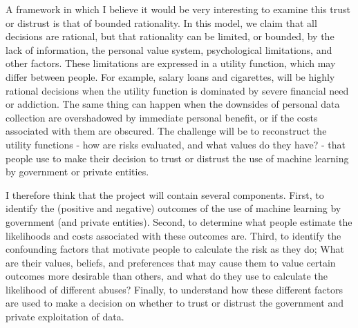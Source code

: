 \documentclass[letterpaper, 10pt]{article} %
\begin{document}
\begin{tcolorbox}[
	blanker,
	width=0.90\textwidth,
	enlarge left by=0.05\textwidth,
	enlarge right by=0.05\textwidth,
	before skip=6pt,
	breakable]
A framework in which I believe it would be very interesting to examine this trust or distrust is that of bounded rationality.
In this model, we claim that all decisions are rational, but that rationality can be limited, or bounded, by the lack of information, the personal value system, psychological limitations, and other factors.
These limitations are expressed in a utility function, which may differ between people.
For example, salary loans and cigarettes, will be highly rational decisions when the utility function is dominated by severe financial need or addiction.
The same thing can happen when the downsides of personal data collection are overshadowed by immediate personal benefit, or if the costs associated with them are obscured.
The challenge will be to reconstruct the utility functions - how are risks evaluated, and what values do they have? - that people use to make their decision to trust or distrust the use of machine learning by government or private entities.


I therefore think that the project will contain several components.
First, to identify the (positive and negative) outcomes of the use of machine learning by government (and private entities).
Second, to determine what people estimate the likelihoods and costs associated with these outcomes are.
Third, to identify the confounding factors that motivate people to calculate the risk as they do; What are their values, beliefs, and preferences that may cause them to value certain outcomes more desirable than others, and what do they use to calculate the likelihood of different abuses?
Finally, to understand how these different factors are used to make a decision on whether to trust or distrust the government and private exploitation of data.


\end{tcolorbox}
\end{document}
